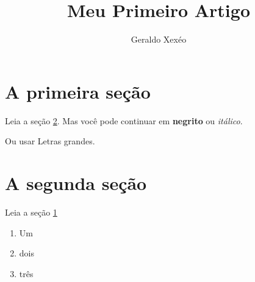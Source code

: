 \documentclass{article}
\title{Meu Primeiro Artigo}
\author{Geraldo Xexéo}
\begin{document}
\maketitle  

\section{A primeira seção}\label{sec:pri}

Leia a seção \ref{sec:seg}.
Mas você pode continuar em \textbf{negrito} ou \textit{itálico}.

Ou usar \Huge{Letras grandes}.

\section{A segunda seção}\label{sec:seg}

\normalsize
Leia a seção \ref{sec:pri}

\begin{enumerate}
    \item Um
    \item dois
    \item três
\end{enumerate}
\end{document}
